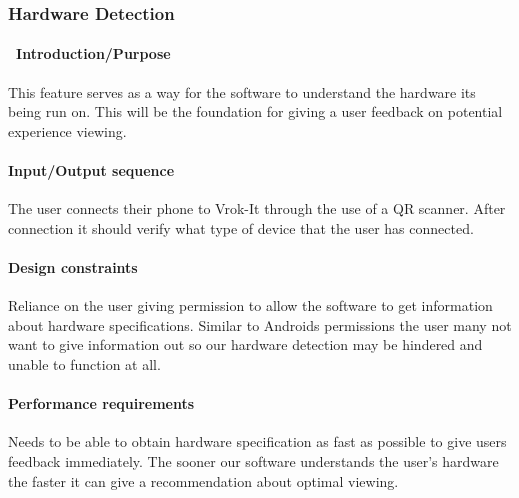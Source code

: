 \documentclass[letterpaper, 10pt, draftclsnofoot, compsoc, onecolumn]{IEEEtran}
\begin{document}
{%


\subsubsection[{Hardware Detection}]{\rmfamily\bfseries\color{black}  Hardware Detection}
\paragraph[\ Introduction/Purpose]{\foreignlanguage{english}{\ }\foreignlanguage{english}{Introduction/Purpose
}}
{\color{black}
This feature serves as a way for the software to understand the hardware its being run on. This will be the foundation for giving a user feedback on potential experience viewing. }

\paragraph[Input/Output sequence]{\rmfamily\bfseries\color{black}
Input/Output sequence }
{\color{black}
The user connects their phone to Vrok-It through the use of a QR scanner. After connection it should verify what type of device that the user has connected. }

\paragraph[Design constraints]{\rmfamily\bfseries\color{black} Design
constraints }
{\color{black}
Reliance on the user giving permission to allow the software to get information about hardware specifications. Similar to Androids permissions the user many not want to give information out so our hardware detection may be hindered and unable to function at all. }

\paragraph[Performance requirements]{\rmfamily\bfseries\color{black}
Performance requirements }
{\color{black}
Needs to be able to obtain hardware specification as fast as possible to give users feedback immediately. The sooner our software understands the user's hardware the faster it can give a recommendation about optimal viewing. }

}
\end{document}
